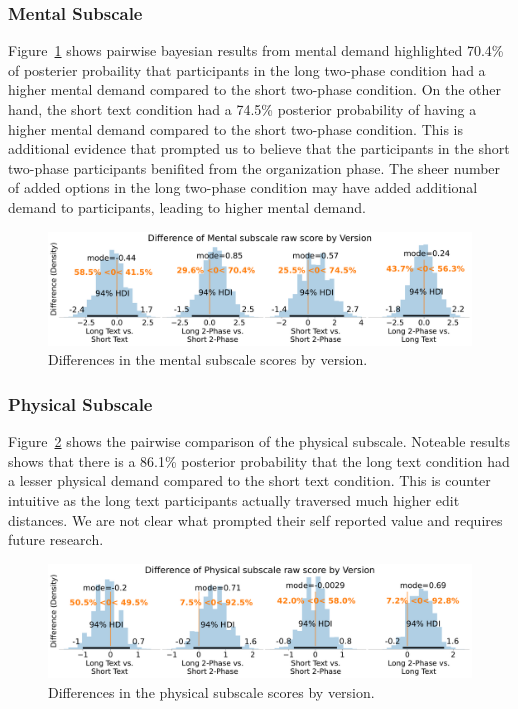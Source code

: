\subsubsection{Mental Subscale}
Figure~\ref{fig:bayesian_mental_subscale} shows pairwise bayesian results from mental demand highlighted 70.4\% of posterier probaility that participants in the long two-phase condition had a higher mental demand compared to the short two-phase condition. On the other hand, the short text condition had a 74.5\% posterior probability of having a higher mental demand compared to the short two-phase condition. This is additional evidence that prompted us to believe that the participants in the short two-phase participants benifited from the organization phase. The sheer number of added options in the long two-phase condition may have added additional demand to participants, leading to higher mental demand.

\begin{figure}[h!]
    \centering
    \includegraphics[width=\textwidth]{content/image/cog/Mental_cog_diff_single_row.pdf}
    \caption{Differences in the mental subscale scores by version.}
    \label{fig:bayesian_mental_subscale}
\end{figure}

\subsubsection{Physical Subscale}
Figure~\ref{fig:bayesian_physical_subscale} shows the pairwise comparison of the physical subscale. Noteable results shows that there is a 86.1\% posterior probability that the long text condition had a lesser physical demand compared to the short text condition. This is counter intuitive as the long text participants actually traversed much higher edit distances. We are not clear what prompted their self reported value and requires future research. 

\begin{figure}[h!]
    \centering
    \includegraphics[width=\textwidth]{content/image/cog/Physical_cog_diff_single_row.pdf}
    \caption{Differences in the physical subscale scores by version.}
    \label{fig:bayesian_physical_subscale}
\end{figure}

